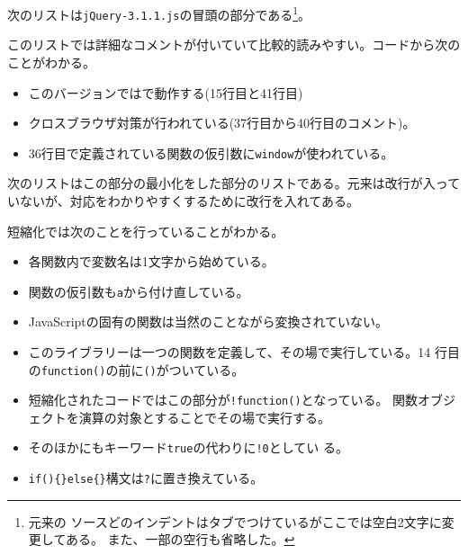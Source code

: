 次のリストは\texttt{jQuery-3.1.1.js}の冒頭の部分である\footnote{元来の
ソースどのインデントはタブでつけているがここでは空白2文字に変更してある。
また、一部の空行も省略した。}。

このリストでは詳細なコメントが付いていて比較的読みやすい。コードから次の
ことがわかる。
\begin{itemize}
 \item このバージョンでは\Strict で動作する(15行目と41行目)
 \item クロスブラウザ対策が行われている(37行目から40行目のコメント)。
 \item 36行目で定義されている関数の仮引数に\Verb+window+が使われている。
\end{itemize}
次のリストはこの部分の最小化をした部分のリストである。元来は改行が入って
いないが、対応をわかりやすくするために改行を入れてある。


短縮化では次のことを行っていることがわかる。
\begin{itemize}
 \item 各関数内で変数名は1文字から始めている。
 \item 関数の仮引数も\texttt{a}から付け直している。
 \item JavaScriptの固有の関数は当然のことながら変換されていない。
 \item このライブラリーは一つの関数を定義して、その場で実行している。14
       行目の\texttt{function()}の前に\texttt{()}がついている。
 \item 短縮化されたコードではこの部分が\texttt{!function()}となっている。
       関数オブジェクトを演算の対象とすることでその場で実行する。
 \item そのほかにもキーワード\texttt{true}の代わりに\texttt{!0}としてい
       る。
 \item \texttt{if()\{\}else\{\}}構文は\texttt{?}に置き換えている。
\end{itemize}
